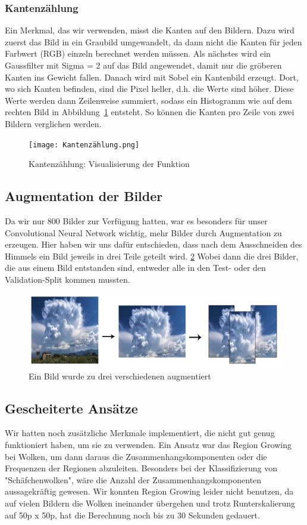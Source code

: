 \documentclass[a4,german]{article}
\begin{document}
\subsubsection{Kantenzählung}
Ein Merkmal, das wir verwenden, misst die Kanten auf den Bildern. Dazu wird zuerst das Bild in ein Graubild umgewandelt, da dann nicht die Kanten für jeden Farbwert (RGB) einzeln berechnet werden müssen. Als nächstes wird ein Gaussfilter mit Sigma = 2 auf das Bild angewendet, damit nur die gröberen Kanten ins Gewicht fallen. Danach wird mit Sobel ein Kantenbild erzeugt. Dort, wo sich Kanten befinden, sind die Pixel heller, d.h. die Werte sind höher. Diese Werte werden dann Zeilenweise summiert, sodass ein Histogramm wie auf dem rechten Bild in Abbildung~\ref{fig:kaz} entsteht. So können die Kanten pro Zeile von zwei Bildern verglichen werden.

\begin{figure}[h!]
\centering
\texttt{[image: Kantenzählung.png]}
\caption{Kantenzählung: Visualisierung der Funktion}
    \label{fig:kaz}
\end{figure}

\subsection{Augmentation der Bilder}
Da wir nur 800 Bilder zur Verfügung hatten, war es besonders für unser Convolutional Neural Network wichtig, mehr Bilder durch Augmentation zu erzeugen.
Hier haben wir uns dafür entschieden, dass nach dem Ausschneiden des Himmels ein Bild jeweils in drei Teile geteilt wird. \ref{fig:augmentation}
Wobei dann die drei Bilder, die aus einem Bild entstanden sind, entweder alle in den Test- oder den Validation-Split kommen mussten.
\begin{figure}[h!]
\centering
\includegraphics[width=\textwidth]{Augmentation}
\caption{Ein Bild wurde zu drei verschiedenen augmentiert}
    \label{fig:augmentation}
\end{figure}

\subsection{Gescheiterte Ansätze}
Wir hatten noch zusätzliche Merkmale implementiert, die nicht gut genug funktioniert haben, um sie zu verwenden.
Ein Ansatz war das Region Growing bei Wolken, um dann daraus die Zusammenhangskomponenten oder die Frequenzen der Regionen abzuleiten.
Besonders bei der Klassifizierung von  "Schäfchenwolken", wäre die Anzahl der Zusammenhangskomponenten aussagekräftig gewesen.
Wir konnten Region Growing leider nicht benutzen, da auf vielen Bildern die Wolken ineinander übergehen und trotz Runterskalierung auf 50p x 50p, hat die Berechnung noch bis zu 30 Sekunden gedauert.
\end{document}
